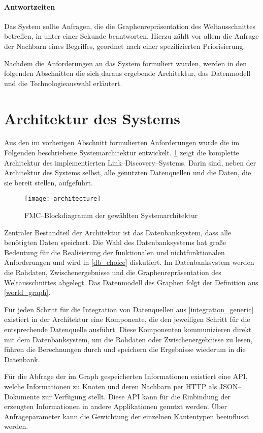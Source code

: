 \paragraph{Antwortzeiten} Das System sollte Anfragen, die die Graphenrepräsentation des Weltausschnittes betreffen, in unter einer Sekunde beantworten. Hierzu zählt vor allem die Anfrage der Nachbarn eines Begriffes, geordnet nach einer spezifizierten Priorisierung.

Nachdem die Anforderungen an das System formuliert wurden, werden in den folgenden Abschnitten die sich daraus ergebende Architektur, das Datenmodell und die Technologieauswahl erläutert.

\section{Architektur des Systems}
\label{architecture}

Aus den im vorherigen Abschnitt formulierten Anforderungen wurde die im Folgenden beschriebene Systemarchitektur entwickelt. \cref{fig:architecture} zeigt die komplette Architektur des implementierten Link--Discovery--Systems. Darin sind, neben der Architektur des Systems selbst, alle genutzten Datenquellen und die Daten, die sie bereit stellen, aufgeführt.

\begin{figure}
\centering
\texttt{[image: architecture]}
\caption{FMC--Blockdiagramm der gewählten Systemarchitektur}
\label{fig:architecture}
\end{figure}

Zentraler Bestandteil der Architektur ist das Datenbanksystem, dass alle benötigten Daten speichert. Die Wahl des Datenbanksystems hat große Bedeutung für die Realisierung der funktionalen und nichtfunktionalen Anforderungen und wird in \cref{db_choice} diskutiert. Im Datenbanksystem werden die Rohdaten, Zwischenergebnisse und die Graphenrepräsentation des Weltausschnittes abgelegt. Das Datenmodell des Graphen folgt der Definition aus \cref{world_graph}.

Für jeden Schritt für die Integration von Datenquellen aus \cref{integration_generic} existiert in der Architektur eine Komponente, die den jeweiligen Schritt für die entsprechende Datenquelle ausführt. Diese Komponenten kommunizieren direkt mit dem Datenbanksystem, um die Rohdaten oder Zwischenergebnisse zu lesen, führen die Berechnungen durch und speichern die Ergebnisse wiederum in die Datenbank.

Für die Abfrage der im Graph gespeicherten Informationen existiert eine API, welche Informationen zu Knoten und deren Nachbarn per HTTP als JSON--Dokumente \cite{json2006} zur Verfügung stellt. Diese API kann für die Einbindung der erzeugten Informationen in andere Applikationen genutzt werden. Über Anfrageparameter kann die Gewichtung der einzelnen Kantentypen beeinflusst werden.

